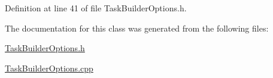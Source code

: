 Definition at line 41 of file Task\+Builder\+Options.\+h.



The documentation for this class was generated from the following files\+:\begin{DoxyCompactItemize}
\item 
\hyperlink{TaskBuilderOptions_8h}{Task\+Builder\+Options.\+h}\item 
\hyperlink{TaskBuilderOptions_8cpp}{Task\+Builder\+Options.\+cpp}\end{DoxyCompactItemize}
